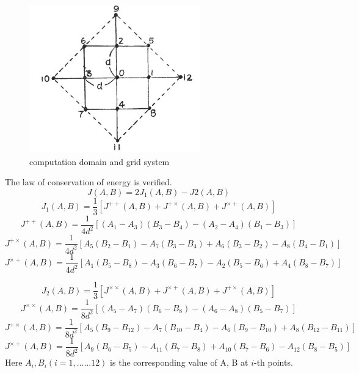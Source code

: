 \documentclass{article}
\begin{document}
\begin{figure}
    \centering
    \includegraphics[scale=0.45]{./imgs/wiki/12-points-fd.png}
    \caption{computation domain and grid system}     
    \label{fig:1}
\end{figure}
The law of conservation of energy is verified.
\begin{equation}
    J(A, B) = 2J_1(A, B)-J2(A, B)
\end{equation}
\begin{equation}
    J_1(A, B) = \frac{1}{3}[J^{++}(A, B)+J^{+\times}(A, B)+J^{\times+}(A, B)]
\end{equation}
\begin{equation}
    J^{++}(A, B) = \frac{1}{4d^2}[(A_1-A_3)(B_3-B_4)-(A_2-A_4)(B_1-B_3)]
\end{equation}
\begin{equation}
    J^{+\times}(A, B)= \frac{1}{4d^2}[A_5(B_2-B_1)-A_7(B_3-B_4)+A_6(B_3-B_2)-A_8(B_4-B_1)]
\end{equation}
\begin{equation}
    J^{\times+}(A, B) = \frac{1}{4d^2}[A_1(B_5-B_8)-A_3(B_6-B_7)-A_2(B_5-B_6)+A_4(B_8-B_7)]
\end{equation}

\begin{equation}
    J_2(A, B) = \frac{1}{3}[J^{\times\times}(A, B)+J^{\times+}(A, B)+J^{+\times}(A, B)]
\end{equation}
\begin{equation}
    J^{\times\times}(A, B) = \frac{1}{8d^2}[(A_5-A_7)(B_6-B_8)-(A_6-A_8)(B_5-B_7)]
\end{equation}
\begin{equation}
    J^{+\times}(A, B)= \frac{1}{8d^2}[A_5(B_9-B_{12})-A_7(B_{10}-B_4)-A_6(B_9-B_{10})+A_8(B_{12}-B_{11})]
\end{equation}
\begin{equation}
    J^{\times+}(A, B) = \frac{1}{8d^2}[A_9(B_6-B_5)-A_{11}(B_7-B_8)+A_{10}(B_7-B_6)-A_{12}(B_8-B_5)]
\end{equation}
Here $A_i, B_i (i=1,......12)$ is the corresponding value of A, B at $i$-th points.
\end{document}
